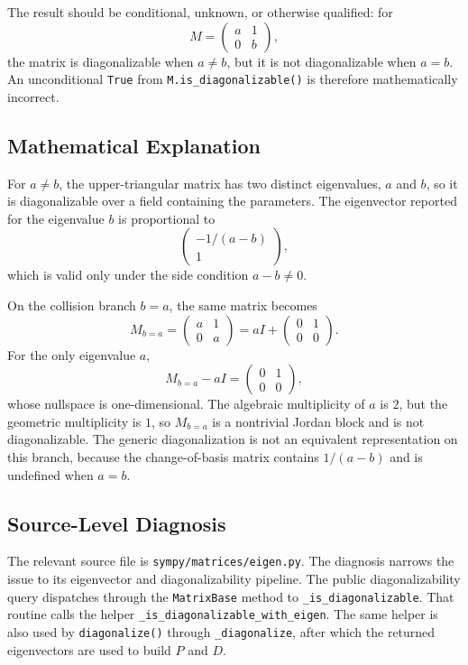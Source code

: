 \documentclass[11pt]{article}
\begin{document}
The result should be conditional, unknown, or otherwise qualified: for
\[
M=\begin{pmatrix}a&1\\0&b\end{pmatrix},
\]
the matrix is diagonalizable when \(a\ne b\), but it is not diagonalizable when \(a=b\). An unconditional \texttt{True} from \texttt{M.is\_diagonalizable()} is therefore mathematically incorrect.

\subsection{Mathematical Explanation}

For \(a\ne b\), the upper-triangular matrix has two distinct eigenvalues, \(a\) and \(b\), so it is diagonalizable over a field containing the parameters. The eigenvector reported for the eigenvalue \(b\) is proportional to
\[
\begin{pmatrix}-1/(a-b)\\1\end{pmatrix},
\]
which is valid only under the side condition \(a-b\ne 0\).

On the collision branch \(b=a\), the same matrix becomes
\[
M_{b=a}=\begin{pmatrix}a&1\\0&a\end{pmatrix}
      = aI+\begin{pmatrix}0&1\\0&0\end{pmatrix}.
\]
For the only eigenvalue \(a\),
\[
M_{b=a}-aI=\begin{pmatrix}0&1\\0&0\end{pmatrix},
\]
whose nullspace is one-dimensional. The algebraic multiplicity of \(a\) is \(2\), but the geometric multiplicity is \(1\), so \(M_{b=a}\) is a nontrivial Jordan block and is not diagonalizable. The generic diagonalization is not an equivalent representation on this branch, because the change-of-basis matrix contains \(1/(a-b)\) and is undefined when \(a=b\).

\subsection{Source-Level Diagnosis}

The relevant source file is \nolinkurl{sympy/matrices/eigen.py}. The diagnosis narrows the issue to its eigenvector and diagonalizability pipeline. The public diagonalizability query dispatches through the \texttt{MatrixBase} method to \texttt{\_is\_diagonalizable}. That routine calls the helper \nolinkurl{_is_diagonalizable_with_eigen}. The same helper is also used by \texttt{diagonalize()} through \texttt{\_diagonalize}, after which the returned eigenvectors are used to build \(P\) and \(D\).
\end{document}
